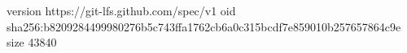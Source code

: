 version https://git-lfs.github.com/spec/v1
oid sha256:b8209284499980276b5c743ffa1762cb6a0c315bcdf7e859010b257657864c9e
size 43840
